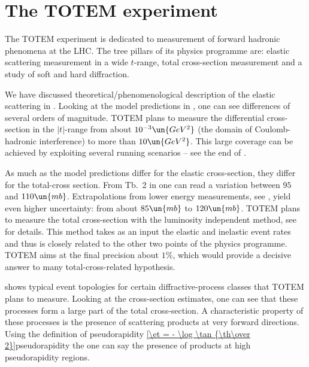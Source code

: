 \iffalse
TOTEM, RP, T1, T2, IP, BPM, BLM
\fi

\chapter[ttm]{The TOTEM experiment}



The TOTEM experiment  is dedicated to measurement of forward hadronic phenomena at the LHC. The tree pillars of its physics programme are:
\> elastic scattering measurement in a wide $t$-range,
\> total cross-section measurement and
\> a study of soft and hard diffraction.


We have discussed theoretical/phenomenological description of the elastic scattering in . Looking at the model predictions in , one can see differences of several orders of magnitude. TOTEM plans to measure the differential cross-section in the $|t|$-range from about $10^{-3}\un{GeV^2}$ (the domain of Coulomb-hadronic interference) to more than $10\un{GeV^2}$. This large coverage can be achieved by exploiting several running scenarios -- see the end of . 

As much as the model predictions differ for the elastic cross-section, they differ for the total-cross section. From Tb.~2 in  one can read a variation between $95$ and $110\un{mb}$. Extrapolations from lower energy measurements, see , yield even higher uncertainty: from about $85\un{mb}$ to $120\un{mb}$. TOTEM plans to measure the total cross-section with the luminosity independent method, see  for details. This method takes as an input the elastic and inelastic event rates and thus is closely related to the other two points of the physics programme. TOTEM aims at the final precision about $1\percent$, which would provide a decisive answer to many total-cross-related hypothesis.

 shows typical event topologies for certain diffractive-process classes that TOTEM plans to measure. Looking at the cross-section estimates, one can see that these processes form a large part of the total cross-section. A characteristic property of these processes is the presence of scattering products at very forward directions. Using the definition of pseudorapidity
\eqref{\et = - \log \tan {\th\over 2}}{pseudorapidity}
the one can say the presence of products at high pseudorapidity regions. 


